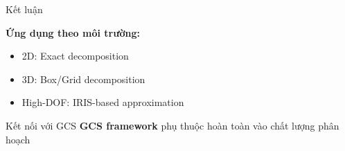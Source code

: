 \documentclass[aspectratio=169]{beamer}
\begin{document}





\begin{frame}{Kết luận}

    \textbf{Ứng dụng theo môi trường:}
    \begin{itemize}
        \item 2D: Exact decomposition
        \item 3D: Box/Grid decomposition
        \item High-DOF: IRIS-based approximation
    \end{itemize}

    \vspace{1em}
    \begin{alertblock}{Kết nối với GCS}
        \textbf{GCS framework} phụ thuộc hoàn toàn vào chất lượng phân hoạch
    \end{alertblock}

\end{frame}
\end{document}
